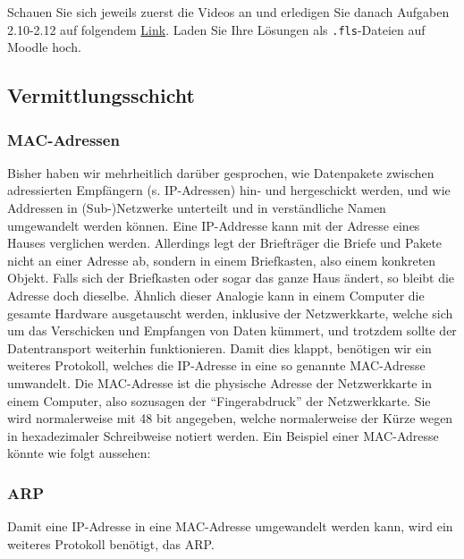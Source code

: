 \begin{mysubmission}
	Schauen Sie sich jeweils zuerst die Videos an und erledigen Sie danach Aufgaben 2.10-2.12 auf folgendem \href{https://informatik.mygymer.ch/base/?book=network}{Link}. Laden Sie Ihre Lösungen als \texttt{.fls}-Dateien auf Moodle hoch.
\end{mysubmission}

\subsection{Vermittlungsschicht}
\subsubsection{MAC-Adressen}
Bisher haben wir mehrheitlich darüber gesprochen, wie Datenpakete zwischen adressierten Empfängern (s. \gls{IP}-Adressen) hin- und hergeschickt werden, und wie Addressen in (Sub-)Netzwerke unterteilt und in verständliche Namen umgewandelt werden können. Eine \gls{IP}-Addresse kann mit der Adresse eines Hauses verglichen werden. Allerdings legt der Briefträger die Briefe und Pakete nicht an einer Adresse ab, sondern in einem Briefkasten, also einem konkreten Objekt. Falls sich der Briefkasten oder sogar das ganze Haus ändert, so bleibt die Adresse doch dieselbe. Ähnlich dieser Analogie kann in einem Computer die gesamte Hardware ausgetauscht werden, inklusive der Netzwerkkarte, welche sich um das Verschicken und Empfangen von Daten kümmert, und trotzdem sollte der Datentransport weiterhin funktionieren. Damit dies klappt, benötigen wir ein weiteres Protokoll, welches die \gls{IP}-Adresse in eine so genannte \gls{MAC}-Adresse umwandelt. Die \gls{MAC}-Adresse ist die physische Adresse der Netzwerkkarte in einem Computer, also sozusagen der ``Fingerabdruck'' der Netzwerkkarte. Sie wird normalerweise mit 48 bit angegeben, welche normalerweise der Kürze wegen in hexadezimaler Schreibweise notiert werden. Ein Beispiel einer \gls{MAC}-Adresse könnte wie folgt aussehen: 

\subsubsection{ARP}
Damit eine \gls{IP}-Adresse in eine \gls{MAC}-Adresse umgewandelt werden kann, wird ein weiteres Protokoll benötigt, das \gls{ARP}.


